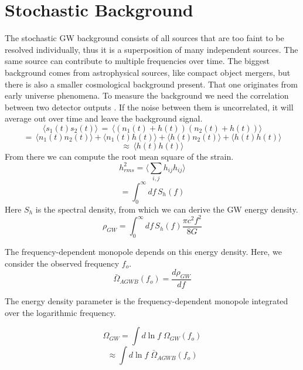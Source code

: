 \section{Stochastic Background}
The stochastic GW background consists of all sources that are too faint to be resolved individually, thus it is a superposition of many independent sources. The same source can contribute to multiple frequencies over time. 
The biggest background comes from astrophysical sources, like compact object mergers, but there is also a smaller cosmological background present. That one originates from early universe phenomena. 
To measure the background we need the correlation between two detector
outputs \cite{christensen_stochastic_2019}. If the noise between them is uncorrelated, it will average out over time and leave the background signal.
\begin{equation}
    \langle s_1 (t) s_2(t)\rangle \, = \, \langle(n_1(t) + h(t))(n_2(t) + h(t))\rangle
\end{equation}
\begin{equation}
    = \, \langle n_1(t) n_2(t)\rangle + \langle n_1(t)h(t)\rangle + \langle h(t)n_2(t)\rangle  + \langle h(t)h(t)\rangle  
\end{equation}
\begin{equation}
    \approx \, \langle h(t)h(t)\rangle 
\end{equation}
From there we can compute the root mean square of the strain.
\begin{equation}
    h_{rms}^2 = \langle \sum_{i,j} h_{ij} h_{ij}\rangle 
\end{equation}
\begin{equation}
    = \int_0^\infty df \, S_h (f)
\end{equation}
Here $S_h$ is the spectral density, from which we can derive the GW energy
density.
\begin{equation}
    \rho_{GW} = \int_0^\infty df \, S_h(f) \frac{\pi c^2 f^2}{8G}
\end{equation} 

The frequency-dependent monopole depends on this energy density. Here, we consider the observed frequency $f_o$.
\begin{equation}
    \bar{\Omega}_{AGWB}(f_o)=\frac{d\rho_{GW}}{df}
\end{equation}

The energy density parameter is the frequency-dependent monopole integrated over the logarithmic frequency.

\begin{equation}
    \Omega_{GW} = \int d\ln f \; \Omega_{GW}(f_o) 
\end{equation}
\begin{equation}
    \approx \int d\ln f \; \bar{\Omega}_{AGWB}(f_o)
\end{equation}

